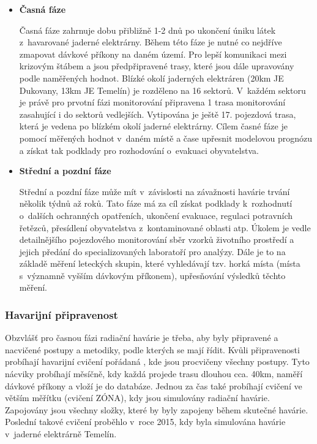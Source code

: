 \begin{itemize}
	\item \textbf{Časná fáze}
	
		Časná fáze zahrnuje dobu přibližně 1-2 dnů po ukončení
úniku látek z~havarované jaderné elektrárny. Během této fáze je nutné
co nejdříve zmapovat dávkové příkony na daném území. Pro lepší
komunikaci mezi krizovým štábem a  jsou předpřipravené trasy,
které jsou dále upravovány podle naměřených hodnot. Blízké okolí
jaderných elektráren (20km JE Dukovany, 13km JE Temelín) je rozděleno
na 16 sektorů. V~každém sektoru je právě pro prvotní fázi monitorování
připravena 1 trasa monitorování zasahující i do sektorů
vedlejších. Vytipována je ještě 17. pojezdová trasa, která je vedena
po blízkém okolí jaderné elektrárny. Cílem časné fáze je pomocí
měřených hodnot v~daném místě a čase upřesnit modelovou prognózu a
získat tak podklady pro rozhodování o~evakuaci obyvatelstva.

	\item \textbf{Střední a pozdní fáze}
		
		Střední a pozdní fáze může mít v~závislosti na
závažnosti havárie trvání několik týdnů až roků. Tato fáze má za cíl
získat podklady k~rozhodnutí o~dalších ochranných opatřeních, ukončení
evakuace, regulaci potravních řetězců, přesídlení obyvatelstva
z~kontaminované oblasti atp. Úkolem  je vedle detailnějšího
pojezdového monitorování sběr vzorků životního prostředí a jejich
předání do specializovaných laboratoří pro analýzy. Dále je to na
základě měření leteckých skupin, které vyhledávají tzv. horká místa
(místa s~významně vyšším dávkovým příkonem), upřesňování výsledků
těchto měření.
\end{itemize}

\subsubsection{Havarijní připravenost}

Obzvlášť pro časnou fázi radiační havárie je třeba, aby byly
připravené a nacvičené postupy a metodiky, podle kterých se 
mají řídit. Kvůli připravenosti probíhají havarijní cvičení pořádaná
, kde jsou procvičeny všechny postupy. Tyto nácviky probíhají
měsíčně, kdy každá  projede trasu dlouhou cca. 40km, naměří
dávkové příkony a vloží je do databáze. Jednou za čas také probíhají
cvičení ve větším měřítku (cvičení ZÓNA), kdy jsou simulovány radiační
havárie. Zapojovány jsou všechny složky, které by byly zapojeny během
skutečné havárie. Poslední takové cvičení proběhlo v~roce 2015, kdy
byla simulována havárie v~jaderné elektrárně Temelín.

